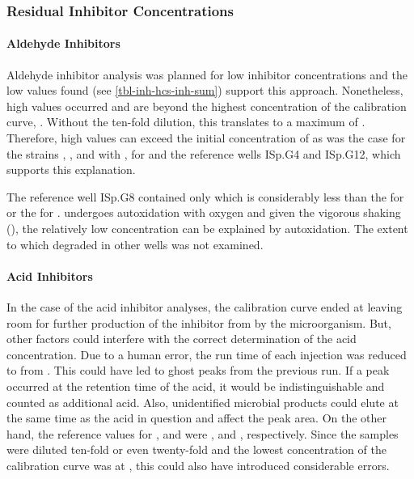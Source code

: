 \subsubsection{Residual Inhibitor Concentrations\label{subsubsec-lch-eps-disc-inh-hcs-acid-analysis}}
\paragraph{Aldehyde Inhibitors}
Aldehyde inhibitor analysis was planned for low inhibitor concentrations and the low values found (see \vref{tbl-inh-hcs-inh-sum}) support this approach. Nonetheless, high values occurred and are beyond the highest concentration of the calibration curve, . Without the ten-fold dilution, this translates to a maximum of . Therefore, high values can exceed the initial concentration of  as was the case for the strains , ,  and  with \van{},  for \hmf{} and the reference wells ISp.G4 and ISp.G12, which supports this explanation.

\label{intext-lch-eps-disc-fur-autoxidation}The \fur{} reference well ISp.G8 contained only  which is considerably less than the  for \hmf{} or the  for \van{}. \FUR{} undergoes autoxidation with oxygen \cite{Dunlop1948} and given the vigorous shaking (), the relatively low concentration can be explained by autoxidation. The extent to which \fur{} degraded in other wells was not examined.

\paragraph{Acid Inhibitors}
In the case of the acid inhibitor analyses, the calibration curve ended at  leaving room for further production of the inhibitor from \glc{} by the microorganism. But, other factors could interfere with the correct determination of the acid concentration. Due to a human error, the run time of each injection was reduced to  from . This could have led to ghost peaks from the previous run. If a peak occurred at the retention time of the acid, it would be indistinguishable and counted as additional acid. Also, unidentified microbial products could elute at the same time as the acid in question and affect the peak area. On the other hand, the reference values for \fora{}, \acet{} and \laev{} were ,  and , respectively. Since the samples were diluted ten-fold or even twenty-fold and the lowest concentration of the calibration curve was at , this could also have introduced considerable errors.

